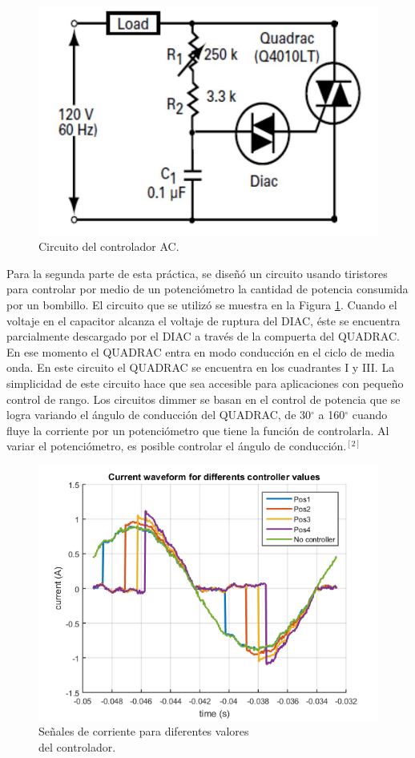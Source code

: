 \documentclass[journal]{IEEEtran}
\begin{document}
\begin{figure}[h]
\centering
\includegraphics[clip,width=0.6\columnwidth]{controller.png}
\caption{Circuito del controlador AC.}
\label{ACcontroller}
\end{figure}

Para la segunda parte de esta práctica, se diseñó un 
circuito usando tiristores para controlar por medio 
de un potenciómetro la cantidad 
de potencia consumida por un bombillo. 
El circuito que se utilizó se muestra 
en la Figura \ref{ACcontroller}. 
Cuando el voltaje en el capacitor alcanza el 
voltaje de ruptura del DIAC, éste se encuentra 
parcialmente descargado por el DIAC a través de la 
compuerta del QUADRAC. En ese momento el QUADRAC 
entra en modo conducción en el ciclo de media onda. 
En este circuito el QUADRAC se encuentra en los 
cuadrantes I y III. La simplicidad de este circuito 
hace que sea accesible para aplicaciones con pequeño 
control de rango. Los circuitos dimmer se basan en el 
control de potencia que se logra variando el ángulo de 
conducción del QUADRAC, de 30$^{\circ}$ a 160$^{\circ}$ 
cuando fluye la 
corriente por un potenciómetro que tiene la función de 
controlarla. Al variar el potenciómetro, es 
posible controlar el
ángulo de conducción.$^{\left[2\right]}$ 

\begin{figure}[h]
\centering
\includegraphics[clip,width=0.9\columnwidth]{controller_values.png}
\caption{Señales de corriente para diferentes valores \\
del controlador.}
\label{ACcontroller_plots}
\end{figure}
\end{document}
